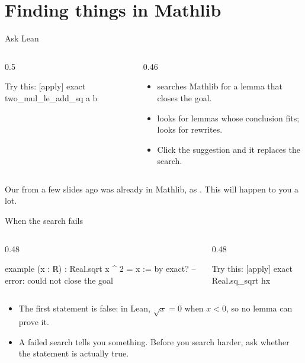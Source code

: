 \documentclass[10pt, aspectratio=169]{beamer}
\begin{document}
\section{Finding things in Mathlib}

\begin{frame}[fragile]{Ask Lean}
\begin{columns}[T]
\begin{column}{0.5\textwidth}
\begin{leanout}
Try this:
  [apply] exact two_mul_le_add_sq a b
\end{leanout}
\end{column}
\begin{column}{0.46\textwidth}
\begin{itemize}
\item {} searches Mathlib for a lemma that closes the goal.
\item {} looks for lemmas whose conclusion fits;  looks for rewrites.
\item Click the suggestion and it replaces the search.
\end{itemize}
\end{column}
\end{columns}

\vspace{0.5em}
\begin{caveat}
Our  from a few slides ago was already in Mathlib, as . This will happen to you a lot.
\end{caveat}
\end{frame}

\begin{frame}[fragile]{When the search fails\livedemo}
\begin{columns}[T]
\begin{column}{0.48\textwidth}
\begin{leanout}[title={\scriptsize\sffamily Without a hypothesis}]
example (x : ℝ) :
    Real.sqrt x ^ 2 = x := by
  exact?
-- error: could not close the goal
\end{leanout}
\end{column}
\begin{column}{0.48\textwidth}
\begin{leanout}
Try this:
  [apply] exact Real.sq_sqrt hx
\end{leanout}
\end{column}
\end{columns}

\vspace{0.5em}
\begin{itemize}
\item The first statement is false: in Lean, $\sqrt{x} = 0$ when $x < 0$, so no lemma can prove it.
\item A failed search tells you something. Before you search harder, ask whether the statement is actually true.
\end{itemize}
\end{frame}
\end{document}
